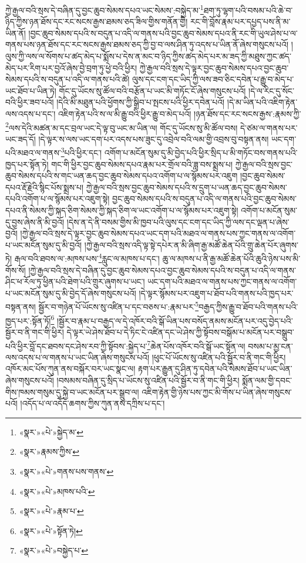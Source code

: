 ཀྱེ་རྒྱལ་བའི་སྲས་དེ་བཞིན་དུ་བྱང་ཆུབ་སེམས་དཔའ་ཡང་སེམས་:བསྐྱེད་མ་\footnote{«སྣར་»«པེ་»སྐྱེད་མ་}ཐག་ཏུ་ལྷག་པའི་བསམ་པའི་ཆེ་བ་ཉིད་ཀྱིས་ཉན་ཐོས་དང་རང་སངས་རྒྱས་ཐམས་ཅད་ཟིལ་གྱིས་གནོན་གྱི། རང་གི་བློས་རྣམ་པར་དཔྱད་པས་ནི་མ་ཡིན་ནོ། །བྱང་ཆུབ་སེམས་དཔའི་ས་བདུན་པ་འདི་ལ་གནས་པའི་བྱང་ཆུབ་སེམས་དཔའ་ནི་རང་གི་ཡུལ་ཤེས་པ་ལ་གནས་པས་ཉན་ཐོས་དང་རང་སངས་རྒྱས་ཐམས་ཅད་ཀྱི་བྱ་བ་ལས་ཤིན་ཏུ་འདས་པ་ཡིན་ནོ་ཞེས་གསུངས་པའོ། །ལུས་ཀྱི་ལས་ལ་སོགས་པ་ཚད་མེད་པ་སྨོས་པ་དེས་ན་མང་བ་ཉིད་ཀྱིས་ཚད་མེད་པར་མ་ཟད་ཀྱི་མཐུས་ཀྱང་ཚད་མེད་པར་རིག་པར་བྱའོ་ཞེས་བྱེ་བྲག་ཏུ་ཕྱེ་བའི་ཕྱིར། ཀྱེ་རྒྱལ་བའི་སྲས་དེ་ལྟར་བྱང་ཆུབ་སེམས་དཔའ་བྱང་ཆུབ་སེམས་དཔའི་ས་བདུན་པ་འདི་ལ་གནས་པའི་ཚེ། ལུས་དང་ངག་དང་ཡིད་ཀྱི་ལས་ཟབ་ཅིང་དབེན་པ་རྒྱུ་བ་མེད་པ་ཡང་ཐོབ་པ་ཡིན་ཏེ། གོང་དུ་ཡོངས་སུ་ཚོལ་བའི་བརྩོན་པ་ཡང་མི་གཏོང་ངོ་ཞེས་གསུངས་པའོ། །དེ་ལ་རིང་དུ་སོང་བའི་ཕྱིར་ཟབ་པའོ། །དེའི་མི་མཐུན་པའི་ཕྱོགས་ཀྱི་སྒྲིབ་པ་སྤངས་པའི་ཕྱིར་དབེན་པའོ། །དེ་མ་ཡིན་པའི་འཇིག་རྟེན་ལས་འདས་པ་དང་། འཇིག་རྟེན་པའི་ས་ལ་མི་རྒྱུ་བའི་ཕྱིར་རྒྱུ་བ་མེད་པའོ། །ཉན་ཐོས་དང་རང་སངས་རྒྱས་:རྣམས་ཀྱི་\footnote{«སྣར་»རྣམས་ཀྱིས་}ལས་དེའི་མཚན་མ་དང་བྲལ་ཡང་དེ་ལྟ་བུ་ཡང་མ་ཡིན་ལ། གོང་དུ་ཡོངས་སུ་མི་ཚོལ་བས། དེ་ཙམ་ལ་གནས་པར་ཡང་ཟད་དོ། །དེ་ལྟར་ས་ལས་ཡང་དག་པར་འདས་པས་ཟུང་དུ་འབྲེལ་བའི་ལམ་གྱི་འབྲས་བུ་བསྟན་ནས། ཡང་དག་པའི་མཐའ་ལ་གནས་\footnote{«སྣར་»«པེ་»གནས་པས་གནས་}པའི་ཕྱིར་དང་། འགོག་པ་མངོན་སུམ་དུ་མི་བྱེད་པའི་ཕྱིར་སྲིད་པ་མི་གཏོང་བས་གནས་པའི་ཁྱད་པར་སྟོན་ཏེ། གང་གི་ཕྱིར་བྱང་ཆུབ་སེམས་དཔའ་རྣམ་པར་གྲོལ་བའི་ཟླ་བས་སྨྲས་པ། ཀྱེ་རྒྱལ་བའི་སྲས་བྱང་ཆུབ་སེམས་དཔའི་ས་གང་ཡན་ཆད་བྱང་ཆུབ་སེམས་དཔའ་འགོག་པ་ལ་སྙོམས་པར་འཇུག །བྱང་ཆུབ་སེམས་དཔའ་རྡོ་རྗེའི་སྙིང་པོས་སྨྲས་པ། ཀྱེ་རྒྱལ་བའི་སྲས་བྱང་ཆུབ་སེམས་དཔའི་ས་དྲུག་པ་ཡན་ཆད་བྱང་ཆུབ་སེམས་དཔའི་འགོག་པ་ལ་སྙོམས་པར་འཇུག་སྟེ། བྱང་ཆུབ་སེམས་དཔའི་ས་བདུན་པ་འདི་ལ་གནས་པའི་བྱང་ཆུབ་སེམས་དཔའ་ནི་སེམས་ཀྱི་སྐད་ཅིག་སེམས་ཀྱི་སྐད་ཅིག་ལ་ཡང་འགོག་པ་ལ་སྙོམས་པར་འཇུག་སྟེ། འགོག་པ་མངོན་སུམ་དུ་བྱས་ཞེས་ནི་མི་བྱའོ། །དེས་ན་དེ་ནི་བསམ་གྱིས་མི་ཁྱབ་པའི་ལུས་དང་ངག་དང་ཡིད་ཀྱི་ལས་དང་ལྡན་པ་ཞེས་བྱའོ། །ཀྱེ་རྒྱལ་བའི་སྲས་དེ་ལྟར་བྱང་ཆུབ་སེམས་དཔའ་ཡང་དག་པའི་མཐའ་ལ་གནས་པས་ཀྱང་གནས་ལ་འགོག་པ་ཡང་མངོན་སུམ་དུ་མི་བྱའོ། །ཀྱེ་རྒྱལ་བའི་སྲས་འདི་ལྟ་སྟེ་དཔེར་ན་མི་ཞིག་རྒྱ་མཚོ་ཆེན་པོའི་གྲུ་ཆེན་པོར་ཞུགས་ཏེ། རྒལ་བའི་ཐབས་ལ་:མཁས་པས་\footnote{«སྣར་»«པེ་»མཁས་པའི་}རླུང་ལ་མཁས་པ་དང་། ཆུ་ལ་མཁས་པ་ནི་རྒྱ་མཚོ་ཆེན་པོའི་ཆུའི་ཉེས་པས་མི་གོས་སོ། །ཀྱེ་རྒྱལ་བའི་སྲས་དེ་བཞིན་དུ་བྱང་ཆུབ་སེམས་དཔའ་བྱང་ཆུབ་སེམས་དཔའི་ས་བདུན་པ་འདི་ལ་གནས་ཤིང་ཕ་རོལ་ཏུ་ཕྱིན་པའི་ཐེག་པའི་གྲུར་ཞུགས་པ་ཡང་། ཡང་དག་པའི་མཐའ་ལ་གནས་པས་ཀྱང་གནས་ལ་འགོག་པ་ཡང་མངོན་སུམ་དུ་མི་བྱེད་དོ་ཞེས་གསུངས་པའོ། །དེ་ལྟར་སྙོམས་པར་འཇུག་པ་ཐོབ་པའི་གནས་པའི་ཁྱད་པར་བསྟན་ནས། སྦྱོར་བ་གཉེན་པོ་ཡོངས་སུ་འཛིན་པ་དང་བཅས་པ་:རྣམ་པར་\footnote{«སྣར་»«པེ་»རྣམ་པ་}བརྒྱད་ཀྱིས་རྒྱུ་བ་ཐོབ་པའི་གནས་པའི་ཁྱད་པར་:སྟོན་ཏོ།\footnote{«སྣར་»«པེ་»སྟོན་ཏེ།} །སྦྱོར་བ་རྣམ་པ་བརྒྱད་ལ་དེ་འཁོར་བའི་སྒོ་ཡིན་པས་བསོད་ནམས་མངོན་པར་འདུ་བྱེད་པའི་སྦྱོར་བ་ནི་གང་གི་ཕྱིར། དེ་ལྟར་ཡེ་ཤེས་ཐོབ་པ་དེ་ཏིང་ངེ་འཛིན་དང་ཡེ་ཤེས་ཀྱི་སྟོབས་བསྒོམ་པ་མངོན་པར་བསྒྲུབ་པའི་ཕྱིར་བློ་དང་ཐབས་དང་ཤེས་རབ་ཀྱི་སྟོབས་:སྐྱེད་པ་\footnote{«སྣར་»«པེ་»བསྐྱེད་པ་}ཆེན་པོས་འཁོར་བའི་སྒོ་ཡང་སྟོན་ལ། བསམ་པ་མྱ་ངན་ལས་འདས་པ་ལ་གནས་པ་ཡང་ཡིན་ཞེས་གསུངས་པའོ། །ཕུང་པོ་ཡོངས་སུ་འཛིན་པའི་སྦྱོར་བ་ནི་གང་གི་ཕྱིར། འཁོར་མང་པོས་ཀུན་ནས་བསྐོར་བར་ཡང་སྣང་ལ། རྟག་པར་རྒྱུན་དུ་ཤིན་ཏུ་དབེན་པའི་སེམས་ཐོབ་པ་ཡང་ཡིན་ཞེས་གསུངས་པའོ། །བསམས་བཞིན་དུ་སྲིད་པ་ཡོངས་སུ་འཛིན་པའི་སྦྱོར་བ་ནི་གང་གི་ཕྱིར། སྨོན་ལམ་གྱི་དབང་གིས་ཁམས་གསུམ་དུ་སྐྱེ་བ་ཡང་མངོན་པར་སྒྲུབ་ལ། འཇིག་རྟེན་གྱི་ཉེས་པས་ཀྱང་མི་གོས་པ་ཡིན་ཞེས་གསུངས་པའོ། །འདོད་པ་ལ་འདོད་ཆགས་ཀྱིས་ཀུན་ནས་དཀྲིས་པ་དང་། 